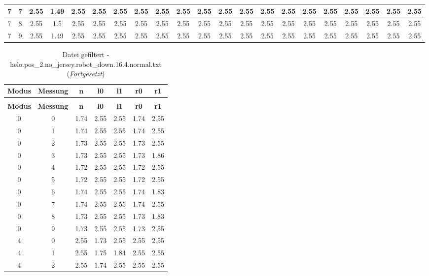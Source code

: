 \begin{landscape}
\begin{longtable}{|c|c||c||c|c|c|c|c|c|c|c|c||c|c|c|c|c|c|c|c|c|}
	7 & 7 & 2.55 & 1.49 & 2.55 & 2.55 & 2.55 & 2.55 & 2.55 & 2.55 & 2.55 & 2.55 & 2.55 & 2.55 & 2.55 & 2.55 & 2.55 & 2.55 & 2.55 & 2.55 & 2.55 \\ \hline
	7 & 8 & 2.55 & 1.5 & 2.55 & 2.55 & 2.55 & 2.55 & 2.55 & 2.55 & 2.55 & 2.55 & 2.55 & 2.55 & 2.55 & 2.55 & 2.55 & 2.55 & 2.55 & 2.55 & 2.55 \\ \hline
	7 & 9 & 2.55 & 1.49 & 2.55 & 2.55 & 2.55 & 2.55 & 2.55 & 2.55 & 2.55 & 2.55 & 2.55 & 2.55 & 2.55 & 2.55 & 2.55 & 2.55 & 2.55 & 2.55 & 2.55 \\ \hline
\end{longtable}

\end{landscape}\clearpage{}
\begin{longtable}{|c|c||c||c|c||c|c|}
	\caption{Datei gefiltert - helo.pos\_2.no\_jersey.robot\_down.16.4.normal.txt} \label{tab:helo.pos-2.no-jersey.robot-down.16.4.normal.txt} \\ \hline
	\textbf{Modus} & \textbf{Messung} & \textbf{n} & \textbf{l0} & \textbf{l1} & \textbf{r0} & \textbf{r1}\\ \hline
	\endfirsthead
	\caption[]{Datei gefiltert - helo.pos\_2.no\_jersey.robot\_down.16.4.normal.txt (\emph{Fortgesetzt})} \\ \hline
	\textbf{Modus} & \textbf{Messung} & \textbf{n} & \textbf{l0} & \textbf{l1} & \textbf{r0} & \textbf{r1}\\ \hline
	\endhead
	0 & 0 & 1.74 & 2.55 & 2.55 & 1.74 & 2.55 \\ \hline
	0 & 1 & 1.74 & 2.55 & 2.55 & 1.74 & 2.55 \\ \hline
	0 & 2 & 1.73 & 2.55 & 2.55 & 1.73 & 2.55 \\ \hline
	0 & 3 & 1.73 & 2.55 & 2.55 & 1.73 & 1.86 \\ \hline
	0 & 4 & 1.72 & 2.55 & 2.55 & 1.72 & 2.55 \\ \hline
	0 & 5 & 1.72 & 2.55 & 2.55 & 1.72 & 2.55 \\ \hline
	0 & 6 & 1.74 & 2.55 & 2.55 & 1.74 & 1.83 \\ \hline
	0 & 7 & 1.74 & 2.55 & 2.55 & 1.74 & 2.55 \\ \hline
	0 & 8 & 1.73 & 2.55 & 2.55 & 1.73 & 1.83 \\ \hline
	0 & 9 & 1.73 & 2.55 & 2.55 & 1.73 & 2.55 \\ \hline
	4 & 0 & 2.55 & 1.73 & 2.55 & 2.55 & 2.55 \\ \hline
	4 & 1 & 2.55 & 1.75 & 1.84 & 2.55 & 2.55 \\ \hline
	4 & 2 & 2.55 & 1.74 & 2.55 & 2.55 & 2.55 \\ \hline

\end{longtable}
